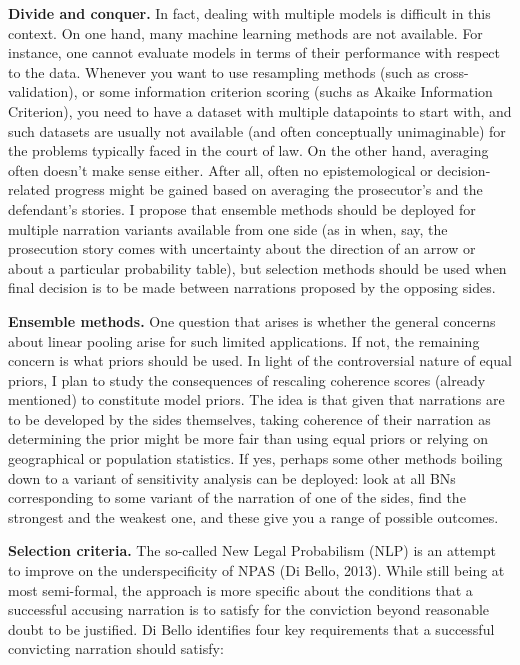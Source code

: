 \documentclass[11pt,dvipsnames,enabledeprecatedfontcommands]{scrartcl}
\begin{document}
\noindent \textbf{Divide and conquer.} In fact, dealing with multiple
models is difficult in this context. On one hand, many machine learning
methods are not available. For instance, one cannot evaluate models in
terms of their performance with respect to the data. Whenever you want
to use resampling methods (such as cross-validation), or some
information criterion scoring (suchs as Akaike Information Criterion),
you need to have a dataset with multiple datapoints to start with, and
such datasets are usually not available (and often conceptually
unimaginable) for the problems typically faced in the court of law. On
the other hand, averaging often doesn't make sense either. After all,
often no epistemological or decision-related progress might be gained
based on averaging the prosecutor's and the defendant's stories. I
propose that ensemble methods should be deployed for multiple narration
variants available from one side (as in when, say, the prosecution story
comes with uncertainty about the direction of an arrow or about a
particular probability table), but selection methods should be used when
final decision is to be made between narrations proposed by the opposing
sides.

\noindent \textbf{Ensemble methods.} One question that arises is whether
the general concerns about linear pooling arise for such limited
applications. If not, the remaining concern is what priors should be
used. In light of the controversial nature of equal priors, I plan to
study the consequences of rescaling coherence scores (already mentioned)
to constitute model priors. The idea is that given that narrations are
to be developed by the sides themselves, taking coherence of their
narration as determining the prior might be more fair than using equal
priors or relying on geographical or population statistics. If yes,
perhaps some other methods boiling down to a variant of sensitivity
analysis can be deployed: look at all BNs corresponding to some variant
of the narration of one of the sides, find the strongest and the weakest
one, and these give you a range of possible outcomes.

\noindent \textbf{Selection criteria.} The so-called New Legal
Probabilism (NLP) is an attempt to improve on the underspecificity of
NPAS (Di Bello, 2013). While still being at most semi-formal, the
approach is more specific about the conditions that a successful
accusing narration is to satisfy for the conviction beyond reasonable
doubt to be justified. Di Bello identifies four key requirements that a
successful convicting narration should satisfy:
\end{document}
